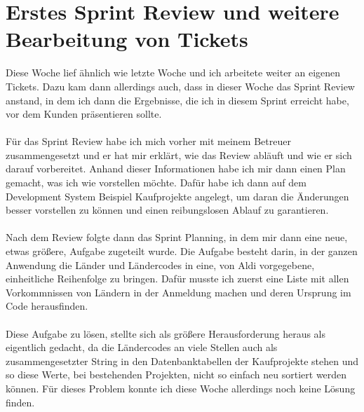 \section{Erstes Sprint Review und weitere Bearbeitung von Tickets}
Diese Woche lief ähnlich wie letzte Woche und ich arbeitete weiter an eigenen Tickets. Dazu kam dann allerdings auch, dass in dieser Woche das Sprint Review anstand, in dem ich dann die Ergebnisse, die ich in diesem Sprint erreicht habe, vor dem Kunden präsentieren sollte. \\\\
Für das Sprint Review habe ich mich vorher mit meinem Betreuer zusammengesetzt und er hat mir erklärt, wie das Review abläuft und wie er sich darauf vorbereitet. Anhand dieser Informationen habe ich mir dann einen Plan gemacht, was ich wie vorstellen möchte. Dafür habe ich dann auf dem Development System Beispiel Kaufprojekte angelegt, um daran die Änderungen besser vorstellen zu können und einen reibungslosen Ablauf zu garantieren. \\\\
Nach dem Review folgte dann das Sprint Planning, in dem mir dann eine neue, etwas größere, Aufgabe zugeteilt wurde. Die Aufgabe besteht darin, in der ganzen Anwendung die Länder und Ländercodes in eine, von Aldi vorgegebene, einheitliche Reihenfolge zu bringen. Dafür musste ich zuerst eine Liste mit allen Vorkommnissen von Ländern in der Anmeldung machen und deren Ursprung im Code herausfinden. \\\\
Diese Aufgabe zu lösen, stellte sich als größere Herausforderung heraus als eigentlich gedacht, da die Ländercodes an viele Stellen auch als zusammengesetzter String in den Datenbanktabellen der Kaufprojekte stehen und so diese Werte, bei bestehenden Projekten, nicht so einfach neu sortiert werden können. Für dieses Problem konnte ich diese Woche allerdings noch keine Lösung finden. \\\\

